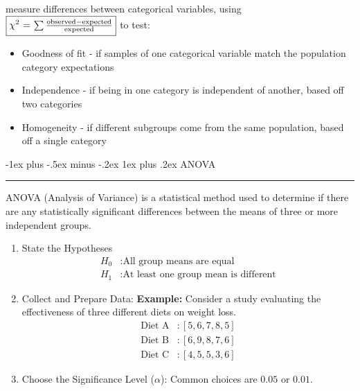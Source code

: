\documentclass[letterpaper, 10.5pt,landscape]{article}
\makeatletter
\renewcommand{\subsubsection}{\@startsection{subsubsection}{3}{0mm}%
                                {-1ex plus -.5ex minus -.2ex}%
                                {1ex plus .2ex}%
                                {\normalfont\small\bfseries}}
\makeatother
\begin{document}
\begin{multicols*}{3}
measure differences between categorical variables, using $\boxed{\chi^2$ = $\sum \frac{\text{observed} - \text{expected}}{\text{expected}}}$ to test:
\begin{itemize}[label={--},leftmargin=4mm]
    \itemsep -.4mm
    \item Goodness of fit - if samples of one categorical variable match the population category expectations
    \item Independence -  if being in one category is independent of another, based off two categories
    \item Homogeneity - if different subgroups come from the same population, based off a single category
\end{itemize}

\vspace{3pt}
\subsubsection{ANOVA} {\color{teal}\hrule height 0.5pt} \smallskip

ANOVA (Analysis of Variance) is a statistical method used to determine if there are any statistically significant differences between the means of three or more independent groups.

\begin{enumerate}
\vspace{-2pt}
    \item State the Hypotheses
    \vspace{-2pt}
    \begin{align*}
    H_0 &: \text{All group means are equal} \\
    H_1 &: \text{At least one group mean is different}
    \end{align*}
    \vspace{-2pt}

    \item Collect and Prepare Data: \textbf{Example:} Consider a study evaluating the effectiveness of three different diets on weight loss.
    \vspace{-2pt}
    \begin{align*}
    \text{Diet A} &: [5, 6, 7, 8, 5] \\
    \text{Diet B} &: [6, 9, 8, 7, 6] \\
    \text{Diet C} &: [4, 5, 5, 3, 6]
    \end{align*}
    \vspace{-2pt}

    
    \item Choose the Significance Level ($\alpha$): Common choices are $0.05$ or $0.01$.
    \vspace{-2pt}


\end{enumerate}
\end{multicols*}
\end{document}
